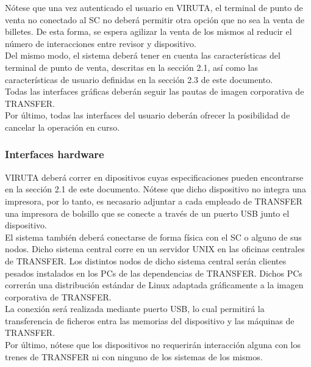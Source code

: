 Nótese que una vez autenticado el usuario en VIRUTA, el terminal de punto de venta no conectado al SC no deberá permitir otra opción que no sea la venta de billetes. De esta forma, se espera agilizar la venta de los mismos al reducir el número de interacciones entre revisor y dispositivo.\\

Del mismo modo, el sistema deberá tener en cuenta las características del terminal de punto de venta, descritas en la sección 2.1, así como las características de usuario definidas en la sección 2.3 de este documento.\\

Todas las interfaces gráficas deberán seguir las pautas de imagen corporativa de TRANSFER.\\

Por último, todas las interfaces del usuario deberán ofrecer la posibilidad de cancelar la operación en curso.\\

\subsubsection{Interfaces hardware}

 VIRUTA deberá correr en dipositivos cuyas especificaciones  pueden encontrarse en la sección 2.1 de este documento. Nótese que dicho dispositivo no integra una impresora, por lo tanto, es necasario adjuntar a cada empleado de TRANSFER una impresora de bolsillo que se conecte a través de un puerto USB junto el dispositivo.\\ 

El sistema también deberá conectarse de forma física con el SC o alguno de sus nodos. Dicho sistema central corre en un servidor UNIX en las oficinas centrales de TRANSFER. Los distintos nodos de dicho sistema central serán clientes pesados instalados en los PCs de las dependencias de TRANSFER. Dichos PCs correrán una distribución estándar de Linux adaptada gráficamente a la imagen corporativa de TRANSFER.\\

La conexión será realizada mediante puerto USB, lo cual permitirá la transferencia de ficheros entra las memorias del dispositivo y las máquinas de TRANSFER.\\

Por último, nótese que los dispositivos no requerirán interacción alguna con los trenes de TRANSFER ni con ninguno de los sistemas de los mismos.


